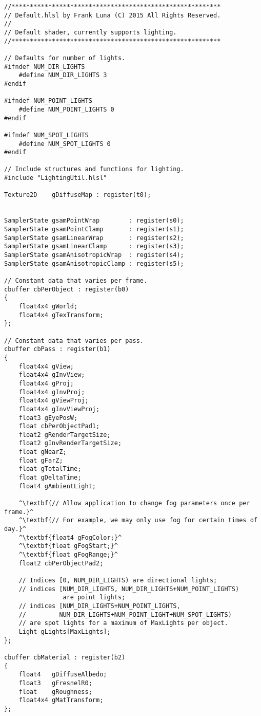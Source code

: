 \begin{lstlisting}[escapechar=^]
//*********************************************************
// Default.hlsl by Frank Luna (C) 2015 All Rights Reserved.
//
// Default shader, currently supports lighting.
//*********************************************************

// Defaults for number of lights.
#ifndef NUM_DIR_LIGHTS
    #define NUM_DIR_LIGHTS 3
#endif

#ifndef NUM_POINT_LIGHTS
    #define NUM_POINT_LIGHTS 0
#endif

#ifndef NUM_SPOT_LIGHTS
    #define NUM_SPOT_LIGHTS 0
#endif

// Include structures and functions for lighting.
#include "LightingUtil.hlsl"

Texture2D    gDiffuseMap : register(t0);


SamplerState gsamPointWrap        : register(s0);
SamplerState gsamPointClamp       : register(s1);
SamplerState gsamLinearWrap       : register(s2);
SamplerState gsamLinearClamp      : register(s3);
SamplerState gsamAnisotropicWrap  : register(s4);
SamplerState gsamAnisotropicClamp : register(s5);

// Constant data that varies per frame.
cbuffer cbPerObject : register(b0)
{
    float4x4 gWorld;
    float4x4 gTexTransform;
};

// Constant data that varies per pass.
cbuffer cbPass : register(b1)
{
    float4x4 gView;
    float4x4 gInvView;
    float4x4 gProj;
    float4x4 gInvProj;
    float4x4 gViewProj;
    float4x4 gInvViewProj;
    float3 gEyePosW;
    float cbPerObjectPad1;
    float2 gRenderTargetSize;
    float2 gInvRenderTargetSize;
    float gNearZ;
    float gFarZ;
    float gTotalTime;
    float gDeltaTime;
    float4 gAmbientLight;

    ^\textbf{// Allow application to change fog parameters once per frame.}^
    ^\textbf{// For example, we may only use fog for certain times of day.}^
    ^\textbf{float4 gFogColor;}^
    ^\textbf{float gFogStart;}^
    ^\textbf{float gFogRange;}^
    float2 cbPerObjectPad2;

    // Indices [0, NUM_DIR_LIGHTS) are directional lights;
    // indices [NUM_DIR_LIGHTS, NUM_DIR_LIGHTS+NUM_POINT_LIGHTS) 
                are point lights;
    // indices [NUM_DIR_LIGHTS+NUM_POINT_LIGHTS, 
    //         NUM_DIR_LIGHTS+NUM_POINT_LIGHT+NUM_SPOT_LIGHTS)
    // are spot lights for a maximum of MaxLights per object.
    Light gLights[MaxLights];
};

cbuffer cbMaterial : register(b2)
{
    float4   gDiffuseAlbedo;
    float3   gFresnelR0;
    float    gRoughness;
    float4x4 gMatTransform;
};


\end{lstlisting}
